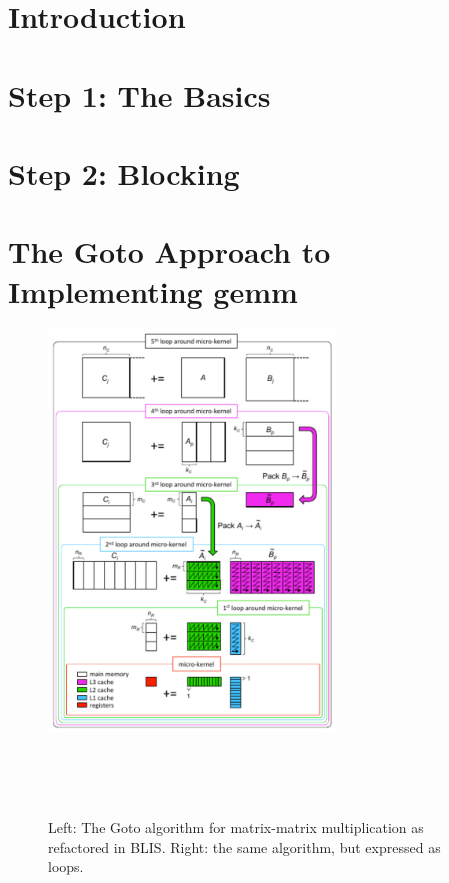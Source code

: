 \section{Introduction}
\label{sec:introduction}



\section{Step 1: The Basics}



\section{Step 2: Blocking}



\section{The Goto Approach to Implementing {\sc gemm}}
\label{sec:BLIS}

\begin{figure}[tb!]
\begin{center}
\begin{minipage}{3in}
\mbox{\includegraphics[width=3.0in]{mm_blis_color.pdf}}
\end{minipage}
~~~
\begin{minipage}[t]{3in}
\footnotesize  
\mbox{  }
\end{minipage}
\end{center}
\caption{Left: The Goto algorithm for matrix-matrix multiplication as  
  refactored in BLIS.  Right: the same algorithm, but expressed as  
  loops.}
\label{fig:blis_gemm}
\end{figure}

